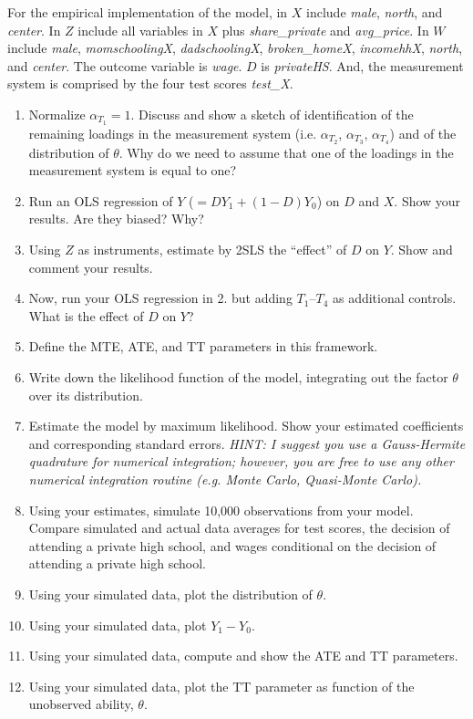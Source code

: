 \documentclass[english,12pt]{article}
\begin{document}
For the empirical implementation of the model, in $X$ include \textit{male}, \textit{north}, and \textit{center}. In $Z$ include all variables in $X$ plus \textit{share\_private} and \textit{avg\_price}. In $W$ include \textit{male}, \textit{momschoolingX}, \textit{dadschoolingX}, \textit{broken\_homeX}, \textit{incomehhX}, \textit{north}, and \textit{center}. The outcome variable is \textit{wage}. $D$ is \textit{privateHS}. And, the measurement system is comprised by the four test scores \textit{test\_X}.


\begin{enumerate}    
	\item Normalize $\alpha_{T_1}=1$. Discuss and show a sketch of identification of the remaining loadings in the measurement system (i.e. $\alpha_{T_2}$, $\alpha_{T_3}$, $\alpha_{T_4}$) and of the distribution of $\theta$. Why do we need to assume that one of the loadings in the measurement system is equal to one?
	\item Run an OLS regression of $Y$ ($=DY_1 + (1-D)Y_0$) on $D$ and $X$. Show your results. Are they biased? Why?
	\item Using $Z$ as instruments, estimate by 2SLS the ``effect'' of $D$ on $Y$. Show and comment your results.
	\item Now, run your OLS regression in 2. but adding $T_1$--$T_4$ as additional controls. What is the effect of $D$ on $Y$?
	\item Define the MTE, ATE, and TT parameters in this framework.
	\item Write down the likelihood function of the model, integrating out the factor $\theta$ over its distribution.
	\item Estimate the model by maximum likelihood. Show your estimated coefficients and corresponding standard errors. \textit{HINT: I suggest you use a Gauss-Hermite quadrature for numerical integration; however, you are free to use any other numerical integration routine (e.g. Monte Carlo, Quasi-Monte Carlo).}
	\item Using your estimates, simulate 10,000 observations from your model. Compare simulated and actual data averages for test scores, the decision of attending a private high school, and wages conditional on the decision of attending a private high school.
	\item Using your simulated data, plot the distribution of $\theta$.
	\item Using your simulated data, plot $Y_1 - Y_0$.
	\item Using your simulated data, compute and show the ATE and TT parameters.
	\item Using your simulated data, plot the TT parameter as function of the unobserved ability, $\theta$.
\end{enumerate}





\end{document}
